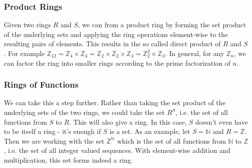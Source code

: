 \subsubsection{Product Rings}
Given two rings $R$ and $S$, we can from a product ring by forming the set product of the underlying sets and applying the ring operations element-wise to the resulting pairs of elements. This results in the so called direct product of $R$ and $S$. For example $\mathbb{Z}_{12} = \mathbb{Z}_4 \times \mathbb{Z}_3 = \mathbb{Z}_2 \times \mathbb{Z}_2 \times \mathbb{Z}_3 = \mathbb{Z}_2^2 \times \mathbb{Z}_3$. In general, for any $\mathbb{Z}_n$, we can factor the ring into smaller rings according to the prime factorization of $n$.



\subsubsection{Rings of Functions}
We can take this a step further. Rather than taking the set product of the underlying sets of the two rings, we could take the set $R^S$, i.e. the set of all functions from $S$ to $R$. This will also give a ring. In this case, $S$ doesn't even have to be itself a ring - it's enough if $S$ is a set. As an example, let $S = \mathbb{N}$ and $R = \mathbb{Z}$. Then we are working with the set $\mathbb{Z}^\mathbb{N}$ which is the set of all functions from $\mathbb{N}$ to $\mathbb{Z}$, i.e. the set of all integer valued sequences. With element-wise addition and multiplication, this set forms indeed a ring.




